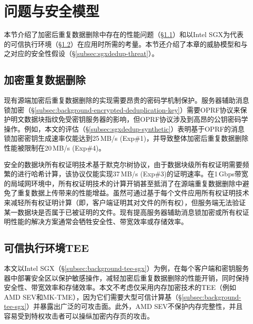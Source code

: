 \section{问题与安全模型}
\label{sec:sgxdedup-background}

本节介绍了加密后重复数据删除中存在的性能问题（\S\ref{subsec:sgxdedup-problem}）和以Intel SGX为代表的可信执行环境（\S\ref{subsec:sgxdedup-sgx}）在应用时所需的考量。本节还介绍了本章的威胁模型和与之对应的安全性假设（\S\ref{subsec:sgxdedup-threat}）。

\subsection{加密重复数据删除}
\label{subsec:sgxdedup-problem}

现有源端加密后重复数据删除的实现需要昂贵的密码学机制保护。服务器辅助消息锁加密（\S\ref{subsec:background-encrypted-deduplication-key}）需要OPRF协议\cite{naor2004Number}来保护明文数据块指纹免受密钥服务器的影响，但OPRF协议涉及到高昂的公钥密码学操作。例如，本文的评估（\S\ref{subsec:sgxdedup-synthetic}）表明基于OPRF的消息锁加密密钥生成速率仅能达到25\,MB/s (Exp\#1)，并导致整体加密后重复数据删除性能被限制在20\,MB/s (Exp\#4)。

安全的数据块所有权证明技术基于默克尔树协议，由于数据块级所有权证明需要频繁的进行哈希计算，该协议仅能实现37\,MB/s (Exp\#3)的证明速率。在1\,Gbps带宽的局域网环境中，所有权证明技术的计算开销甚至抵消了在源端重复数据删除中避免了重复数据上传带来的性能增益。虽然可通过基于每个文件应用所有权证明技术来减轻所有权证明计算（即，客户端证明其对文件的所有权），但服务端无法验证某一数据块是否属于已被证明的文件。现有提高服务器辅助消息锁加密或所有权证明性能的解决方案通常会牺牲安全性\cite{li2020TED,xu2013weak,pietro12}、带宽效率\cite{harnik2010side,li15}或存储效率\cite{zhou2015secdep,qin17,li2020TED}。


\subsection{可信执行环境TEE}
\label{subsec:sgxdedup-sgx} 

本文以Intel SGX\cite{sgx}（\S\ref{subsec:background-tee-sgx}）为例，在每个客户端和密钥服务器中部署安全区以保护敏感操作，减轻加密后重复数据删除的性能开销，同时保持安全性、带宽效率和存储效率。本文不考虑仅采用内存加密技术的TEE（例如AMD SEV\cite{AMDSEV}和MK-TME\cite{MK-TME}），因为它们需要大型可信计算基（\S\ref{subsec:background-tee-sgx}）并暴露出广泛的可攻击面\cite{mofrad18}。此外，AMD SEV\cite{AMDSEV}不保护内存完整性，并且容易受到特权攻击者可以操纵加密内存页\cite{mofrad18}的攻击。


